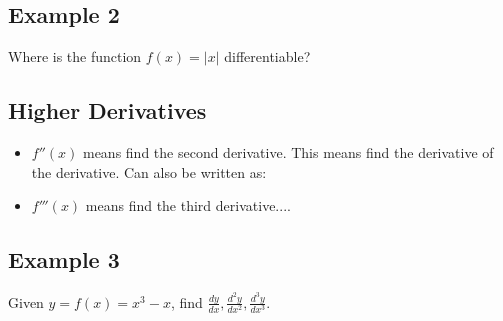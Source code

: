 \documentclass[10pt]{book}
\theoremstyle{definition}
\begin{document}
\subsection*{Example 2}
Where is the function $f(x)=|x|$ differentiable?
\raggedbottom
\clearpage
\begin{tcolorbox}
\subsection*{Higher Derivatives}
\begin{itemize}
    \item $f''(x)$ means find the second derivative. This means find the derivative of the derivative. Can also be written as:
    \item $f'''(x)$ means find the third derivative....
\end{itemize}
\end{tcolorbox}
\subsection*{Example 3}
Given $y=f(x)=x^3-x$, find $\displaystyle\frac{dy}{dx}, \frac{d^2y}{dx^2},\frac{d^3y}{dx^3}$.
\end{document}
